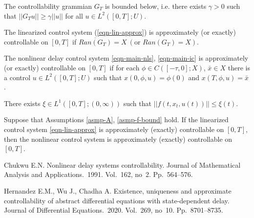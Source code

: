 \documentclass[12pt]{llncs}
\begin{document}
\begin{asmp}\label{asmp-cg-inv}
The controllability grammian $G_T$ is bounded below, i.e. there exists $\gamma > 0$ such that $||G_T u|| \ge \gamma ||u||$ for all $u \in L^2([0,T];U)$.
\end{asmp}

\begin{definition}
The linearized control system (\ref{eqn-lin-approx}) is approximately (or exactly) controllable on $[0,T]$ if $\overline{Ran(G_T)} = X~ (\text{or } Ran(G_T) = X)$.
\end{definition}

\begin{definition}
The nonlinear delay control system \eqref{eqn-main-nls}, \eqref{eqn-main-ic} is approximately (or exactly) controllable on $[0,T]$ if for each $\phi \in C([-\tau,0];X)$, $\bar{x} \in X$ there is a control $u \in L^2([0,T];U)$ such that $x(0,\phi,u) = \phi(0)$ and $x(T,\phi,u) = \bar{x}$.
\end{definition}

\begin{asmp}\label{asmp-f-bound}
There exists $\xi \in L^1([0,T];(0,\infty))$ such that $||f(t,x_t,u(t))|| \le \xi(t)$.
\end{asmp}

\begin{theorem}
Suppose that Assumptions \ref{asmp-A}, \ref{asmp-f-bound} hold. If the linearized control system \eqref{eqn-lin-approx} is approximately (exactly) controllable on $[0,T]$, then the nonlinear control system is approximately (exactly) controllable on $[0,T]$.
\end{theorem}



\begin{thebibliography}{9} %

%

Chukwu E.N. Nonlinear delay systems controllability. Journal of Mathematical Analysis and Applications.~1991. Vol.~162, no~2. Pp.~564--576.

Hernandez E.M., Wu J., Chadha A. Existence, uniqueness and approximate controllability of abstract differential equations with state-dependent delay. Journal of Differential Equations.~2020. Vol.~269, no~10. Pp.~8701--8735.

\end{thebibliography}


%
%
%


\end{document}
